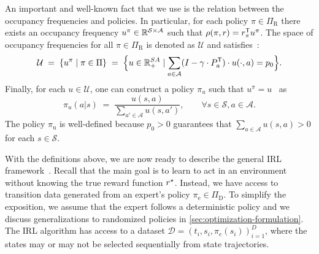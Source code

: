 An important and well-known fact that we use is the relation between the occupancy frequencies and policies. In particular, for each policy $\pi\in\Pi_{\mathrm{R}}$ there exists an occupancy frequency $u^{\pi}\in \mathbb{R}^{\mathcal{S}\times \mathcal{A}}$ such that $\rho(\pi, r) = r_{\pi}^{\mathsf{T}} u^{\pi}$. The space of occupancy frequencies for all $\pi\in \Pi_{\mathrm{R}}$
is denoted as $\mathcal{U}$ and satisfies~\cite[Section~6.9]{Puterman1994}:
\begin{equation} \label{eq:definition-u}
  \mathcal{U}
  \; =\; 
\left\{ u^{\pi} \mid  \pi \in \Pi \right\}
\; =\;
\Bigl\{ u\in \mathbb{R}^{SA}_{+} \mid \sum_{a\in \mathcal{A}} (I - \gamma\cdot P^{\mathsf{T}}_a) \cdot u(\cdot, a) = p_0 \Bigr\}.
\end{equation}
Finally, for each $u\in \mathcal{U}$, one can construct a policy $\pi_u$ such that $u^{\pi} = u$~\cite[Theorem~6.9.1]{Puterman1994} as
\begin{equation}\label{eq:policy-construction}
\pi_u(a|s) \; =\;  \frac{u(s,a)}{\sum_{a' \in \mathcal{A}} u(s,a')}, \qquad \forall s\in \mathcal{S}, a\in \mathcal{A}.
\end{equation}
The policy $\pi_{\mathrm{u}}$ is well-defined because $p_0 > 0$ guarantees that $\sum_{a\in \mathcal{A}} u(s,a) > 0$ for each $s\in \mathcal{S}$. 


With the definitions above, we are now ready to describe the general IRL framework~\cite{abbeel2004,Syed2008,Ho2016}. Recall that the main goal is to learn to act in an environment without knowing the true reward function $r^{\star}$. Instead, we have access to transition data generated from an expert's policy $\pi_{\mathrm{e}} \in \Pi_{\mathrm{D}}$. To simplify the exposition, we assume that the expert follows a deterministic policy and we discuss generalizations to randomized policies in \cref{sec:optimization-formulation}. The IRL algorithm has access to a dataset  \( \mathcal{D} = {(t_i, s_i, \pi_e(s_i))}_{i=1}^D \), where the states may or may not be selected sequentially from state trajectories.

